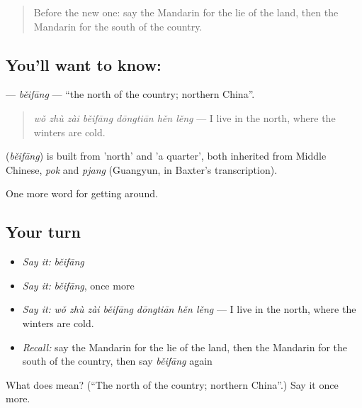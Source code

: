 \label{lesson:ZH-C436-beifang}



\begin{quote}
Before the new one: say the Mandarin for the lie of the land, then the Mandarin for the south of the country.
\end{quote}

\subsection*{You'll want to know: }
\textbf{} — \emph{běifāng} — \textquotedblleft{}the north of the country; northern China\textquotedblright{}.

\begin{quote}
\emph{wǒ zhù zài běifāng dōngtiān hěn lěng} — I live in the north, where the winters are cold.
\end{quote}

\begin{cousinweb}
\textbf{} (\emph{běifāng}) is built from  'north' and  'a quarter', both inherited from Middle Chinese, \emph{pok} and \emph{pjang} (Guangyun, in Baxter's transcription).
\end{cousinweb}

\begin{grammarlens}[title={What you've built}]
One more word for getting around.
\end{grammarlens}

\subsection*{Your turn}
\begin{itemize}
\raggedright
  \item \emph{Say it:} \emph{běifāng}
  \item \emph{Say it:} \emph{běifāng}, once more
  \item \emph{Say it:} \emph{wǒ zhù zài běifāng dōngtiān hěn lěng} — I live in the north, where the winters are cold.
  \item \emph{Recall:} say the Mandarin for the lie of the land, then the Mandarin for the south of the country, then say \emph{běifāng} again
\end{itemize}

\begin{tcolorbox}[breakable,colback=teal!4,colframe=teal!35!black,title={Before you move on}]
What does  mean? (\textquotedblleft{}The north of the country; northern China\textquotedblright{}.) Say it once more.
\end{tcolorbox}
